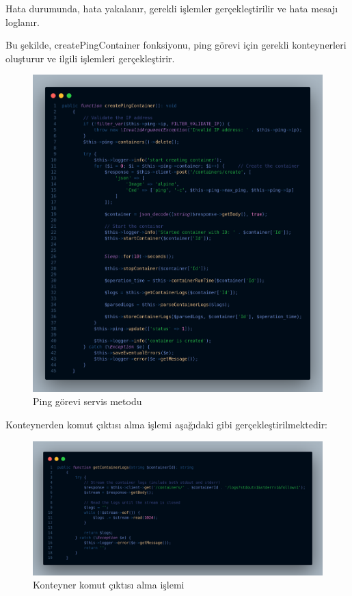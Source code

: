 Hata durumunda, hata yakalanır, gerekli işlemler gerçekleştirilir ve hata mesajı loglanır.

Bu şekilde, createPingContainer fonksiyonu, ping görevi için gerekli konteynerleri oluşturur ve ilgili işlemleri gerçekleştirir.

\begin{figure}[H]
	\centering
	\includegraphics[width=0.9\linewidth]{images/code_ping.png}
	\caption{Ping görevi servis metodu}
	\label{fig:ping_func}
\end{figure}

Konteynerden komut çıktısı alma işlemi aşağıdaki gibi gerçekleştirilmektedir:

\begin{figure}[H]
	\centering
	\includegraphics[width=0.8\linewidth]{images/code_log.png}
	\caption{Konteyner komut çıktısı alma işlemi}
	\label{fig:container_cmd_output}
\end{figure}

